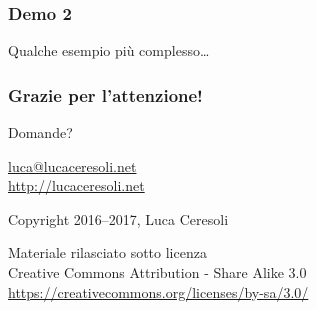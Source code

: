 \documentclass[xetex,table]{beamer}
\begin{document}
\begin{frame}
  \frametitle{Demo 2}
  \begin{center}
    Qualche esempio più complesso\dots
  \end{center}
\end{frame}

\begin{frame}
  \frametitle{Grazie per l'attenzione!}

  \begin{center}
    {\Huge Domande?}

    \vspace{0.1\textheight}

    \href{mailto:luca@lucaceresoli.net}{luca@lucaceresoli.net}\\
    \url{http://lucaceresoli.net}

    \textcopyright{} Copyright 2016--2017, Luca Ceresoli\\

    \vspace{0.2\textheight}

    \tiny
    Materiale rilasciato sotto licenza\\
    Creative Commons Attribution - Share Alike 3.0 \\
    \url{https://creativecommons.org/licenses/by-sa/3.0/} \\
\end{center}
\end{frame}
\end{document}
